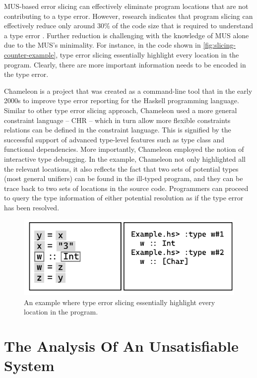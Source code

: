 MUS-based error slicing can effectively eliminate program locations that are not contributing to a type error. However, research indicates that program slicing can effectively reduce only around 30\% of the code size that is required to understand a type error \cite{binkley_empirical_2007}. Further reduction is challenging with the knowledge of MUS alone due to the MUS's minimality. For instance, in the code shown in \ref{fig:slicing-counter-example}, type error slicing essentially highlight every location in the program. Clearly, there are more important information needs to be encoded in the type error.

Chameleon \cite{Stuckey2003-pz} is a project that was created as a command-line tool that in the early 2000s to improve type error reporting 
for the Haskell programming language. Similar to other type error slicing approach, Chameleon used a more general constraint language -- CHR -- which in turn allow more flexible constraints relations can be defined in the constraint language. This is signified by the successful support of advanced type-level features such as type class and functional dependencies. More importantly, Chameleon employed the notion of interactive type debugging. In the example, Chameleon not only highlighted all the relevant locations, it also reflects the fact that two sets of potential types (most general unifiers) can be found in the ill-typed program, and they can be trace back to two sets of locations in the source code. Programmers can proceed to query the type information of either potential resolution as if the type error has been resolved.


\begin{figure}[hbt]
  \includegraphics[width=0.8\linewidth]{ChameleonInteractive}
  \caption{
    \label{fig:chameleon-interactive}
      An example where type error slicing essentially highlight every location in the program.}
\end{figure}

\section{The Analysis Of An Unsatisfiable System}

